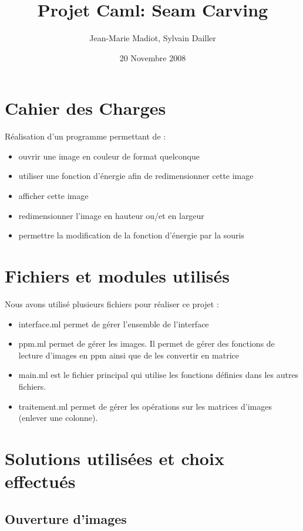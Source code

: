 \documentclass[a4paper]{article}
\title{Projet Caml: Seam Carving}
\author{Jean-Marie Madiot, Sylvain Dailler}
\date{20 Novembre 2008}
\begin{document}
\maketitle{}

\section{Cahier des Charges}

Réalisation d'un programme permettant de :
\begin{itemize}
\item{ouvrir une image en couleur de format quelconque}
\item{utiliser une fonction d'énergie afin de redimensionner cette image}
\item{afficher cette image}
\item{redimensionner l'image en hauteur ou/et en largeur}
\item{permettre la modification de la fonction d'énergie par la souris}

\end{itemize}

\section{Fichiers et modules utilisés}

Nous avons utilisé plusieurs fichiers pour réaliser ce projet : 
\begin{itemize}
\item{interface.ml permet de gérer l'ensemble de l'interface} 
\item{ppm.ml permet de gérer les images. Il permet de gérer des fonctions de lecture d'images en ppm ainsi que de les  convertir en matrice}
\item{main.ml est le fichier principal qui utilise les fonctions définies dans les autres fichiers.}
\item{traitement.ml permet de gérer les opérations sur les matrices d'images (enlever une colonne).} 
\end{itemize}

\section{Solutions utilisées et choix effectués}

\subsection{Ouverture d'images}
\end{document}

